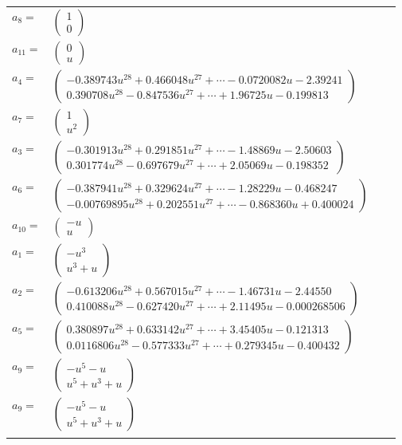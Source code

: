 \documentclass[1p]{elsarticle_modified}
\theoremstyle{definition}
\begin{document}
\begin{tabular}{m{7pt} m{180pt} m{7pt} m{180pt} }
\flushright $a_{8}=$&$\begin{pmatrix}1\\0\end{pmatrix}$ \\
\flushright $a_{11}=$&$\begin{pmatrix}0\\u\end{pmatrix}$ \\
\flushright $a_{4}=$&$\begin{pmatrix}-0.389743 u^{28}+0.466048 u^{27}+\cdots-0.0720082 u-2.39241\\0.390708 u^{28}-0.847536 u^{27}+\cdots+1.96725 u-0.199813\end{pmatrix}$ \\
\flushright $a_{7}=$&$\begin{pmatrix}1\\u^2\end{pmatrix}$ \\
\flushright $a_{3}=$&$\begin{pmatrix}-0.301913 u^{28}+0.291851 u^{27}+\cdots-1.48869 u-2.50603\\0.301774 u^{28}-0.697679 u^{27}+\cdots+2.05069 u-0.198352\end{pmatrix}$ \\
\flushright $a_{6}=$&$\begin{pmatrix}-0.387941 u^{28}+0.329624 u^{27}+\cdots-1.28229 u-0.468247\\-0.00769895 u^{28}+0.202551 u^{27}+\cdots-0.868360 u+0.400024\end{pmatrix}$ \\
\flushright $a_{10}=$&$\begin{pmatrix}- u\\u\end{pmatrix}$ \\
\flushright $a_{1}=$&$\begin{pmatrix}- u^3\\u^3+u\end{pmatrix}$ \\
\flushright $a_{2}=$&$\begin{pmatrix}-0.613206 u^{28}+0.567015 u^{27}+\cdots-1.46731 u-2.44550\\0.410088 u^{28}-0.627420 u^{27}+\cdots+2.11495 u-0.000268506\end{pmatrix}$ \\
\flushright $a_{5}=$&$\begin{pmatrix}0.380897 u^{28}+0.633142 u^{27}+\cdots+3.45405 u-0.121313\\0.0116806 u^{28}-0.577333 u^{27}+\cdots+0.279345 u-0.400432\end{pmatrix}$ \\
\flushright $a_{9}=$&$\begin{pmatrix}- u^5- u\\u^5+u^3+u\end{pmatrix}$\\ \flushright $a_{9}=$&$\begin{pmatrix}- u^5- u\\u^5+u^3+u\end{pmatrix}$\\&\end{tabular}
\end{document}
